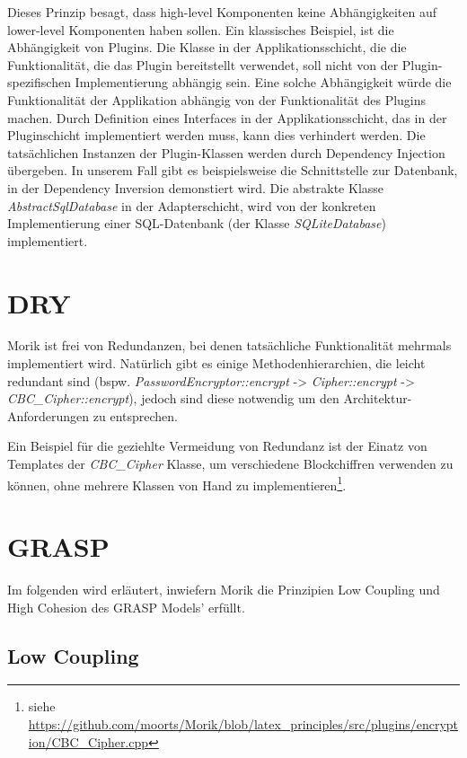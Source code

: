 Dieses Prinzip besagt, dass high-level Komponenten keine Abhängigkeiten auf lower-level Komponenten haben sollen. Ein klassisches Beispiel, ist die Abhängigkeit von Plugins. Die Klasse in der Applikationsschicht, die die Funktionalität, die das Plugin bereitstellt verwendet, soll nicht von der Plugin-spezifischen Implementierung abhängig sein. Eine solche Abhängigkeit würde die Funktionalität der Applikation abhängig von der Funktionalität des Plugins machen. Durch Definition eines Interfaces in der Applikationsschicht, das in der Pluginschicht implementiert werden muss, kann dies verhindert werden. Die tatsächlichen Instanzen der Plugin-Klassen werden durch Dependency Injection übergeben. In unserem Fall gibt es beispielsweise die Schnittstelle zur Datenbank, in der Dependency Inversion demonstiert wird. Die abstrakte Klasse \textit{AbstractSqlDatabase} in der Adapterschicht, wird von der konkreten Implementierung einer SQL-Datenbank (der Klasse \textit{SQLiteDatabase}) implementiert.

\section{DRY}

Morik ist frei von Redundanzen, bei denen tatsächliche Funktionalität mehrmals implementiert wird. Natürlich gibt es einige Methodenhierarchien, die leicht redundant sind (bspw. \textit{PasswordEncryptor::encrypt} -> \textit{Cipher::encrypt} -> \textit{CBC\_Cipher::encrypt}), jedoch sind diese notwendig um den Architektur-Anforderungen zu entsprechen.

Ein Beispiel für die geziehlte Vermeidung von Redundanz ist der Einatz von Templates der \textit{CBC\_Cipher} Klasse, um verschiedene Blockchiffren verwenden zu können, ohne mehrere Klassen von Hand zu implementieren\footnote{siehe \url{https://github.com/moorts/Morik/blob/latex\_principles/src/plugins/encryption/CBC\_Cipher.cpp}}.

\section{GRASP}

Im folgenden wird erläutert, inwiefern Morik die Prinzipien Low Coupling und High Cohesion des GRASP Models' erfüllt.

\subsection{Low Coupling}

